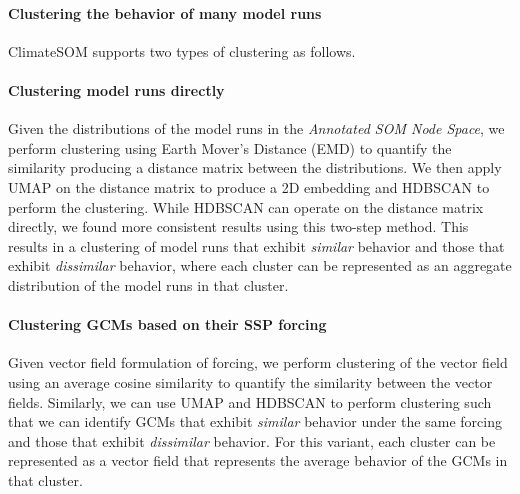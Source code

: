
\vspace{-3pt}
\paragraph{Clustering the behavior of many model runs  } \label{ssec:clustering}
%
ClimateSOM supports two types of clustering as follows.
\paragraph{Clustering model runs directly} Given the distributions of the model runs in the \textit{Annotated SOM Node Space}, we perform clustering using Earth Mover's Distance (EMD)\cite{flamary2021pot} to quantify the similarity producing a distance matrix between the distributions.
%
We then apply UMAP on the distance matrix to produce a 2D embedding and HDBSCAN \cite{mcinnes2017hdbscan} to perform the clustering.
%
While HDBSCAN can operate on the distance matrix directly, we found more consistent results using this two-step method.
%
This results in a clustering of model runs that exhibit \textit{similar} behavior and those that exhibit \textit{dissimilar} behavior, where each cluster can be represented as an aggregate distribution of the model runs in that cluster.
%
\paragraph{Clustering GCMs based on their SSP forcing} Given vector field formulation of forcing, we perform clustering of the vector field using an average cosine similarity to quantify the similarity between the vector fields.
%
Similarly, we can use UMAP and HDBSCAN to perform clustering such that we can identify GCMs that exhibit \textit{similar} behavior under the same forcing and those that exhibit \textit{dissimilar} behavior.
%
For this variant, each cluster can be represented as a vector field that represents the average behavior of the GCMs in that cluster.


